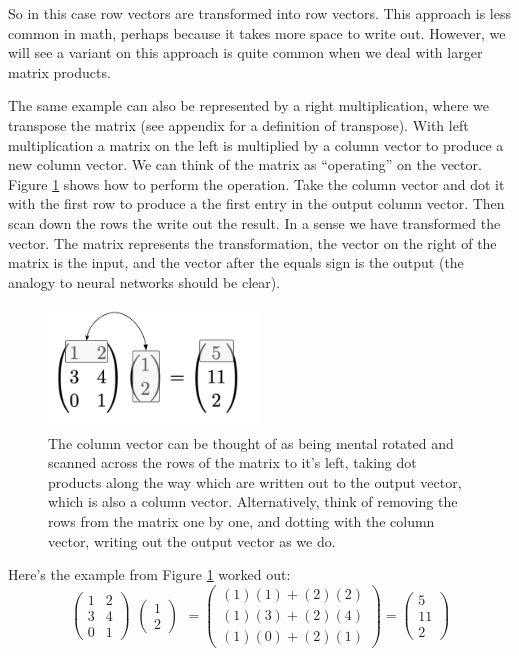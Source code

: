 So in this case row vectors are transformed into row vectors. This approach is less common in math, perhaps because it takes more space to write out. However, we will see a variant on this approach is quite common when we deal with larger matrix products.

The same example can also be represented by a right multiplication, where we transpose the matrix (see appendix for a definition of transpose). With left multiplication  a matrix on the left is multiplied by a column vector to produce a new column vector. We can think of the matrix as ``operating'' on the vector. Figure \ref{matrixVectorProduct} shows how to perform the operation. Take the column vector and dot it with the first row to produce a the first entry in the output column vector. Then scan down the rows the write out the result.  In a sense we have transformed the vector. The matrix represents the transformation, the vector on the right of the matrix is the input, and the vector after the equals sign is the output (the analogy to neural networks should be clear).

\begin{figure}[h]
\centering
\includegraphics[width=0.5\textwidth]{images/matrixVectorProduct.png}
\caption[Jeff Yoshimi.]{The column vector can be thought of as being mental rotated and scanned across the rows of the matrix to it's left, taking dot products along the way which are written out to the output vector, which is also a column vector. Alternatively, think of removing the rows from the matrix one by one, and dotting with the column vector, writing out the output vector as we do.}
\label{matrixVectorProduct}
\end{figure}

Here's the example from Figure \ref{matrixVectorProduct} worked out:
\[
  \begin{pmatrix}
    1 & 2 \\
    3 & 4 \\
    0 & 1
  \end{pmatrix}
    \begin{matrix}
    \begin{pmatrix}1\\2\end{pmatrix}
  \end{matrix}
  =
  \begin{pmatrix}
    (1)(1) + (2)(2) \\
    (1)(3) + (2)(4) \\
    (1)(0) + (2)(1)
  \end{pmatrix}
  =
  \begin{pmatrix}
    5 \\
    11 \\
    2
  \end{pmatrix}
\]
\vspace*{.1cm}


